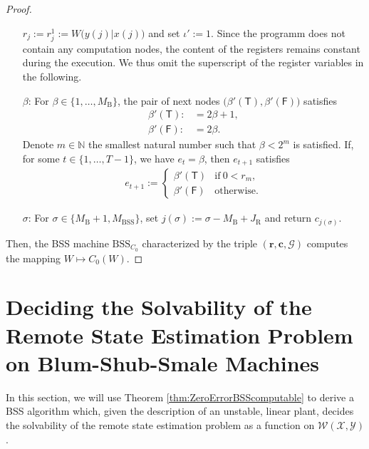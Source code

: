 \documentclass[conference]{IEEEtran}
\def\X{{\mathcal X}}
\def\Y{{\mathcal Y}}
\def\G{{\mathcal G}}
\def\W{{\mathcal W}}
\def\NN{{\mathbb N}}
\newcommand{\BSS}{\mathrm{BSS}}
\begin{document}
\begin{proof}
\begin{enumerate}
											\(r_j := r^1_j := W\big(y(j)|x(j)\big)\) and set \(\iota' := 1\). Since the programm does not contain any computation nodes,
											the content of the registers remains constant during the execution. We thus omit the superscript of the
											register variables in the following.
										\item[\(\beta\)\hspace{1pt}:] 
											For \(\beta \in \{1,\ldots, M_\mathrm{B}\}\), the pair of next nodes \(\big(\beta'(\mathsf{T}),\beta'(\mathsf{F})\big)\) satisfies
											\begin{align*} 	\beta'(\mathsf{T}) :    &=  2\beta + 1, \\
															\beta'(\mathsf{F}) :    &=  2\beta.
											\end{align*}
											Denote \(m\in\NN\) the smallest natural number such that \(\beta < 2^m\) is satisfied. If, for some \(t\in\{1,\ldots, T-1\}\), we have
											\(e_t = \beta\), then \(e_{t+1}\) satisfies
											\begin{align*}   e_{t+1} := \begin{cases}	\beta'(\mathsf{T}) &\text{if}~ 0 < r_m,\\
																						\beta'(\mathsf{F}) &\text{otherwise}.
																		\end{cases}
											\end{align*}
										\item[\(\sigma\)\hspace{1pt}:] For \(\sigma \in \{M_\mathrm{B} +1, M_\BSS\}\), set \(j(\sigma) := \sigma - M_\mathrm{B} + J_\mathrm{R}\) 
											and return \(c_{j(\sigma)}\).
					\end{enumerate}
					Then, the BSS machine \(\BSS_{C_0}\) characterized by the triple \((\bm{r}, \bm{c}, \G)\) computes the mapping \(W\mapsto C_0(W)\).
	\end{proof}

\section{Deciding the Solvability of the Remote State Estimation Problem on Blum-Shub-Smale Machines}	\label{sec:DecidingRemoteStateEstimationOnBSS}
	In this section, we will use Theorem \ref{thm:ZeroErrorBSScomputable} to derive a BSS algorithm which, given the description of an unstable, linear plant,
	decides the solvability of the remote state estimation problem as a function on \(\W(\X,\Y)\).
	
\end{document}
